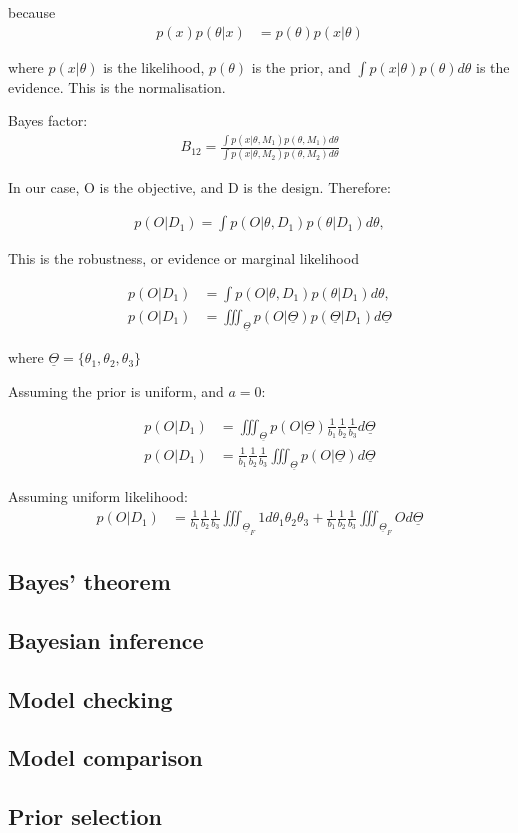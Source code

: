 because
\begin{align*}
p(x)p(\theta|x) &= p(\theta)p(x|\theta)
\end{align*}

where $p(x|\theta)$ is the likelihood, $p(\theta)$ is the prior, and $\displaystyle \int p(x|\theta)p(\theta)d\theta$ is the evidence. This is the normalisation. 

Bayes factor: 
\begin{align*}
B_{12} = \frac{\displaystyle \int p(x|\theta, M_1)p(\theta, M_1)d\theta}{\displaystyle \int p(x|\theta, M_2)p(\theta, M_2)d\theta}
\end{align*}


In our case, O is the objective, and D is the design. Therefore:

\begin{align*}
p(O|D_1) = \int p(O|\theta,D_1)p(\theta|D_1)d\theta,
\end{align*}



This is the robustness, or evidence or marginal likelihood

\begin{align*}
p(O|D_1) &= \displaystyle \int p(O|\theta,D_1)p(\theta|D_1)d\theta, \\
p(O|D_1) &= \displaystyle \iiint_{\underline{\Theta}} p(O|\underline{\Theta})p(\underline{\Theta}|D_1)d\underline{\Theta}
\end{align*}

where $\underline{\Theta} = \{ \theta_1, \theta_2,\theta_3 \}$ 

Assuming the prior is uniform, and $a=0$:

\begin{align*}
p(O|D_1) &= \displaystyle \iiint_{\underline{\Theta}} p(O|\underline{\Theta})\frac{1}{b_1}\frac{1}{b_2}\frac{1}{b_3}d\underline{\Theta} \\
p(O|D_1) &= \frac{1}{b_1}\frac{1}{b_2}\frac{1}{b_3} \displaystyle \iiint_{\underline{\Theta}}p(O|\underline{\Theta})d\underline{\Theta}
\end{align*}


Assuming uniform likelihood:
\begin{align*}
p(O|D_1) &= \frac{1}{b_1}\frac{1}{b_2}\frac{1}{b_3} \displaystyle \iiint_{\underline{\Theta}_F}1d\theta_1\theta_2\theta_3+\frac{1}{b_1}\frac{1}{b_2}\frac{1}{b_3} \displaystyle \iiint_{\underline{\Theta}_F}Od\underline{\Theta}
\end{align*}


\subsection{Bayes' theorem}
\subsection{Bayesian inference}
\subsection{Model checking}
\subsection{Model comparison}
\subsection{Prior selection}






